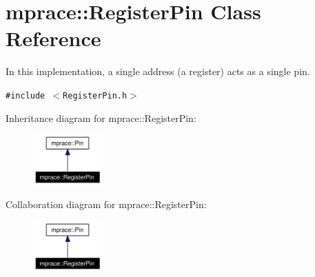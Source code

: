 \hypertarget{classmprace_1_1RegisterPin}{
\section{mprace::Register\-Pin Class Reference}
\label{classmprace_1_1RegisterPin}
}
In this implementation, a single address (a register) acts as a single pin.  


{\tt \#include $<$Register\-Pin.h$>$}

Inheritance diagram for mprace::Register\-Pin:\begin{figure}[H]
\begin{center}
\leavevmode
\includegraphics[width=75pt]{classmprace_1_1RegisterPin__inherit__graph}
\end{center}
\end{figure}
Collaboration diagram for mprace::Register\-Pin:\begin{figure}[H]
\begin{center}
\leavevmode
\includegraphics[width=75pt]{classmprace_1_1RegisterPin__coll__graph}
\end{center}
\end{figure}
